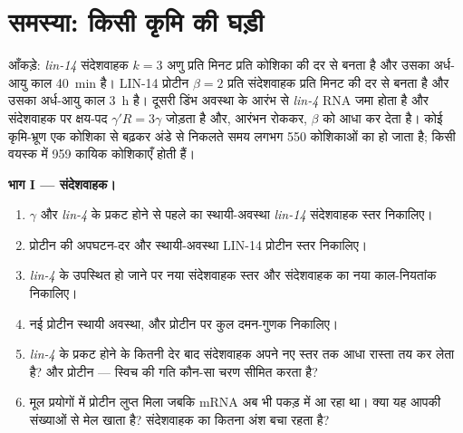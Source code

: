 \section{समस्या: किसी कृमि की घड़ी}

\begin{problem}
\label{pb:b3:rna-regulation:1}
आँकड़े: \emph{lin-14} संदेशवाहक $k = 3$ अणु प्रति मिनट प्रति कोशिका की
दर से बनता है और उसका अर्ध-आयु काल \qty{40}{min} है। LIN-14 प्रोटीन
$\beta = 2$ प्रति संदेशवाहक प्रति मिनट की दर से बनता है और उसका
अर्ध-आयु काल \qty{3}{h} है। दूसरी डिंभ अवस्था के आरंभ से \emph{lin-4}
RNA जमा होता है और संदेशवाहक पर क्षय-पद $\gamma' R = 3\gamma$ जोड़ता है
और, आरंभन रोककर, $\beta$ को आधा कर देता है। कोई कृमि-भ्रूण एक कोशिका से
बढ़कर अंडे से निकलते समय लगभग \num{550} कोशिकाओं का हो जाता है; किसी
वयस्क में \num{959} कायिक कोशिकाएँ होती हैं।

\medskip
\noindent\textbf{भाग I --- संदेशवाहक।}
\begin{enumerate}
  \item $\gamma$ और \emph{lin-4} के प्रकट होने से पहले का
        स्थायी-अवस्था \emph{lin-14} संदेशवाहक स्तर निकालिए।
  \item प्रोटीन की अपघटन-दर और स्थायी-अवस्था LIN-14 प्रोटीन स्तर
        निकालिए।
  \item \emph{lin-4} के उपस्थित हो जाने पर नया संदेशवाहक स्तर और
        संदेशवाहक का नया काल-नियतांक निकालिए।
  \item नई प्रोटीन स्थायी अवस्था, और प्रोटीन पर कुल दमन-गुणक
        निकालिए।
  \item \emph{lin-4} के प्रकट होने के कितनी देर बाद संदेशवाहक अपने नए
        स्तर तक आधा रास्ता तय कर लेता है? और प्रोटीन --- स्विच की गति
        कौन-सा चरण सीमित करता है?
  \item मूल प्रयोगों में प्रोटीन लुप्त मिला जबकि mRNA अब भी पकड़ में आ
        रहा था। क्या यह आपकी संख्याओं से मेल खाता है? संदेशवाहक का
        कितना अंश बचा रहता है?
\end{enumerate}


\end{problem}
